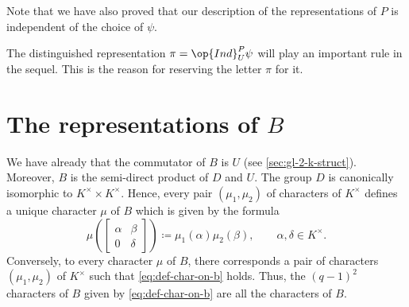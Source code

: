 \documentclass[../main.tex]{subfiles}
\begin{document}
\begin{remark}
	Note that we have also proved that our description of the representations of $P$ is independent of the choice of $\psi$.
\end{remark}
\begin{remark}
	The distinguished representation $\pi=\op{Ind}^P_U\psi$ will play an important rule in the sequel. This is the reason for reserving the letter $\pi$ for it.
\end{remark}

\section{The representations of \texorpdfstring{$B$}{ B}}
We have already that the commutator of $B$ is $U$ (see \cref{sec:gl-2-k-struct}). Moreover, $B$ is the semi-direct product of $D$ and $U$. The group $D$ is canonically isomorphic to $K^\times\times K^\times$. Hence, every pair $(\mu_1,\mu_2)$ of characters of $K^\times$ defines a unique character $\mu$ of $B$ which is given by the formula
\begin{equation}
	\mu\left(\begin{bmatrix}
		\alpha & \beta \\
		0 & \delta
	\end{bmatrix}\right) \coloneqq\mu_1(\alpha)\mu_2(\beta),\qquad\alpha,\delta\in K^\times. \label{eq:def-char-on-b}
\end{equation}
Conversely, to every character $\mu$ of $B$, there corresponds a pair of characters $(\mu_1,\mu_2)$ of $K^\times$ such that \eqref{eq:def-char-on-b} holds. Thus, the $(q-1)^2$ characters of $B$ given by \eqref{eq:def-char-on-b} are all the characters of $B$.
\end{document}
